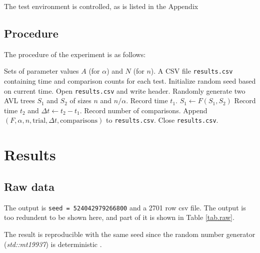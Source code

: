 \documentclass[12pt]{article}
\begin{document}
The test environment is controlled, as is listed in the Appendix

\subsection{Procedure}

The procedure of the experiment is as follows:

\begin{tcolorbox}[breakable, colback=purple!5!white, colframe=purple!75!black, title=Testing Procedure]
\begin{algorithmic}[1]
\Require Sets of parameter values $A$ (for $\alpha$) and $N$ (for $n$).
\Ensure A CSV file \texttt{results.csv} containing time and comparison counts for each test.
    \State Initialize random seed based on current time.
    \State Open \texttt{results.csv} and write header.
                    \State Randomly generate two AVL trees $S_1$ and $S_2$ of sizes $n$ and $n / \alpha$.
                    \State Record time $t_1$.
                    \State $S_1 \gets F(S_1, S_2)$
                    \State Record time $t_2$ and $\Delta t \gets t_2 - t_1$.
                    \State Record number of comparisons.
                    \State Append $(F, \alpha, n, \text{trial}, \Delta t, \text{comparisons})$ to \texttt{results.csv}.
                \EndFor
            \EndFor
        \EndFor
    \EndFor
    \State Close \texttt{results.csv}.
\EndProcedure
\end{algorithmic}
\end{tcolorbox}


\section{Results} %

\subsection{Raw data}

The output is \texttt{seed = 524042979266800} and a 2701 row csv file. The output is too redundent to be shown here, and part of it is shown in Table \ref{tab.raw}.

The result is reproducible with the same seed since the random number generator (\textit{std::mt19937}) is deterministic \cite{cppreference_mt19937}.
\end{document}
